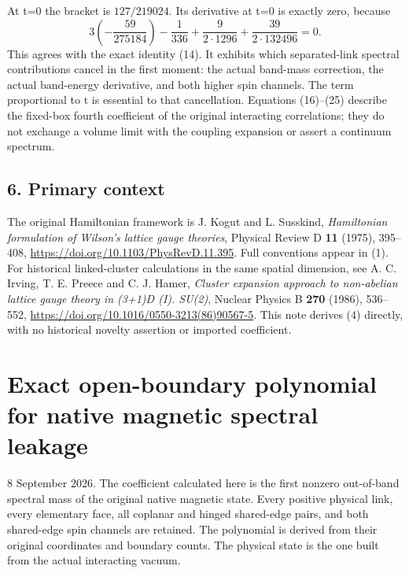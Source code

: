 \documentclass[
  11pt,
]{article}
\begin{document}
At t=0 the bracket is \(127/219024\). Its derivative at t=0 is exactly
zero, because \[
3\left(-\frac{59}{275184}\right)-\frac1{336}
 +\frac{9}{2\cdot1296}+\frac{39}{2\cdot132496}=0.
\tag{25}
\] This agrees with the exact identity (14). It exhibits which
separated-link spectral contributions cancel in the first moment: the
actual band-mass correction, the actual band-energy derivative, and both
higher spin channels. The term proportional to t is essential to that
cancellation. Equations (16)--(25) describe the fixed-box fourth
coefficient of the original interacting correlations; they do not
exchange a volume limit with the coupling expansion or assert a
continuum spectrum.

\subsection{6. Primary context}\label{magnetic-part-10-primary-context}

The original Hamiltonian framework is J. Kogut and L. Susskind,
\emph{Hamiltonian formulation of Wilson's lattice gauge theories},
Physical Review D \textbf{11} (1975), 395--408,
\url{https://doi.org/10.1103/PhysRevD.11.395}. Full conventions appear
in (1). For historical linked-cluster calculations in the same spatial
dimension, see A. C. Irving, T. E. Preece and C. J. Hamer, \emph{Cluster
expansion approach to non-abelian lattice gauge theory in (3+1)D (I).
SU(2)}, Nuclear Physics B \textbf{270} (1986), 536--552,
\url{https://doi.org/10.1016/0550-3213(86)90567-5}. This note derives
(4) directly, with no historical novelty assertion or imported
coefficient.

\clearpage
\section{Exact open-boundary polynomial for native magnetic spectral
leakage}\label{magnetic-part-11-exact-open-boundary-polynomial-for-native-magnetic-spectral-leakage}

8 September 2026. The coefficient calculated here is the first nonzero
out-of-band spectral mass of the original native magnetic state. Every
positive physical link, every elementary face, all coplanar and hinged
shared-edge pairs, and both shared-edge spin channels are retained. The
polynomial is derived from their original coordinates and boundary
counts. The physical state is the one built from the actual interacting
vacuum.
\end{document}
